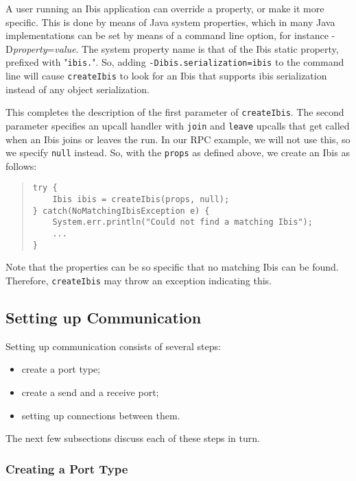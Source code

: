 \documentclass[10pt]{article}
\begin{document}
A user running an Ibis application can override a property, or make it
more specific. This is done by means of Java system properties, which
in many Java implementations can be set by means of a command line option,
for instance -D\emph{property}=\emph{value}.
The system property name is that of the Ibis static property, prefixed
with "\verb+ibis.+".
So, adding \verb+-Dibis.serialization=ibis+ to the command line will
cause \verb+createIbis+ to look for an Ibis that supports ibis serialization
instead of any object serialization.

This completes the description of the first parameter
of \verb+createIbis+. The second parameter specifies an upcall handler
with \verb+join+ and \verb+leave+ upcalls that get called when an Ibis
joins or leaves the run.
In our RPC example, we will not use this, so we specify \verb+null+
instead.
So, with the \verb+props+ as defined above, we create an Ibis as follows:
\begin{quote}
\begin{verbatim}
try {
    Ibis ibis = createIbis(props, null);
} catch(NoMatchingIbisException e) {
    System.err.println("Could not find a matching Ibis");
    ...
}
\end{verbatim}
\end{quote}
Note that the properties can be so specific that no matching Ibis
can be found. Therefore, \verb+createIbis+ may throw an exception
indicating this.

\subsection{Setting up Communication}

Setting up communication consists of several steps:
\begin{itemize}
\item
create a port type;
\item
create a send and a receive port;
\item
setting up connections between them.
\end{itemize}

The next few subsections discuss each of these steps in turn.

\subsubsection{Creating a Port Type}
\end{document}
